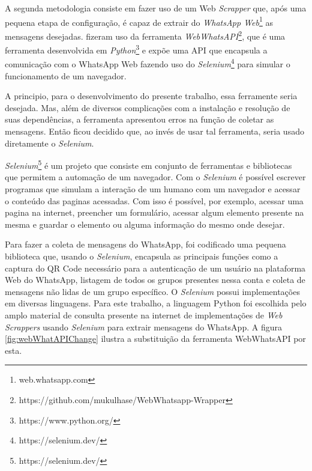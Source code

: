 
A segunda metodologia consiste em fazer uso de um Web\textit{ Scrapper} que, após uma pequena etapa de configuração, é capaz de extrair do \textit{WhatsApp Web}\footnote{web.whatsapp.com} as mensagens desejadas.  fizeram uso da ferramenta \textit{WebWhatsAPI}\footnote{https://github.com/mukulhase/WebWhatsapp-Wrapper}, que é uma ferramenta desenvolvida em \textit{Python}\footnote{https://www.python.org/} e expõe uma API que encapsula a comunicação com o WhatsApp Web fazendo uso do \textit{Selenium}\footnote{https://selenium.dev/} para simular o funcionamento de um navegador.

A principio, para o desenvolvimento do presente trabalho, essa ferramente seria desejada. Mas, além de diversos complicações com a instalação e resolução de suas dependências, a ferramenta apresentou erros na função de coletar as mensagens. Então ficou decidido que, ao invés de usar tal ferramenta, seria usado diretamente o \textit{Selenium}.

\textit{Selenium}\footnote{https://selenium.dev/} é um projeto que consiste em conjunto de ferramentas e bibliotecas que permitem a automação de um navegador. Com o \textit{Selenium} é possível escrever programas que simulam a interação de um humano com um navegador e acessar o conteúdo das paginas acessadas. Com isso é possível, por exemplo, acessar uma pagina na internet, preencher um formulário, acessar algum elemento presente na mesma e guardar o elemento ou alguma informação do mesmo onde desejar.



Para fazer a coleta de mensagens do WhatsApp, foi codificado uma pequena biblioteca que, usando o \textit{Selenium}, encapsula as principais funções como a captura do QR Code necessário para a autenticação de um usuário na plataforma Web do WhatsApp, listagem de todos os grupos presentes nessa conta e coleta de mensagens não lidas de um grupo específico. O \textit{Selenium} possui implementações em diversas linguagens. Para este trabalho, a linguagem Python foi escolhida pelo amplo material de consulta presente na internet de implementações de \textit{Web Scrappers} usando \textit{Selenium} para extrair mensagens do WhatsApp. A figura \ref{fig:webWhatAPIChange} ilustra a substituição da ferramenta WebWhatsAPI por esta.

